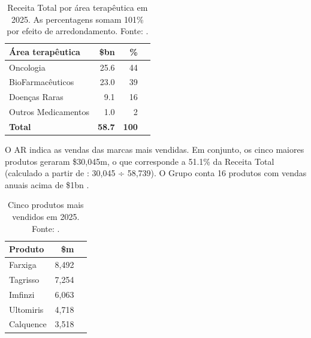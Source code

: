 \begin{table}[H]\centering
\caption{Receita Total por área terapêutica em 2025. As percentagens somam 101\% por efeito de arredondamento. Fonte: \cite[p.~2]{AR}.}
\label{tab:receita-area}
\begin{tabular}{@{}lrrB@{}}
\toprule
\textbf{Área terapêutica} & \textbf{\$bn} & \textbf{\%} & \\
\midrule
Oncologia           & 25.6 & 44 &  \\
BioFarmacêuticos    & 23.0 & 39 &  \\
Doenças Raras       &  9.1 & 16 &  \\
Outros Medicamentos &  1.0 &  2 &  \\
\midrule
\textbf{Total}      & \textbf{58.7} & \textbf{100} & \\
\bottomrule
\end{tabular}
\end{table}
O AR indica as vendas das marcas mais vendidas. Em conjunto, os cinco maiores produtos geraram \$30,045m, o que corresponde a 51.1\% da Receita Total (calculado a partir de \cite[p.~56]{AR}: 30,045 ÷ 58,739). O Grupo conta 16 produtos com vendas anuais acima de \$1bn \cite[p.~50]{AR}.

\begin{table}[H]\centering
\caption{Cinco produtos mais vendidos em 2025. Fonte: \cite[p.~56]{AR}.}
\label{tab:top5}
\begin{tabular}{@{}lrB@{}}
\toprule
\textbf{Produto} & \textbf{\$m} & \\
\midrule
Farxiga   & 8,492 &  \\
Tagrisso  & 7,254 &  \\
Imfinzi   & 6,063 &  \\
Ultomiris & 4,718 &  \\
Calquence & 3,518 &  \\
\bottomrule
\end{tabular}
\end{table}

